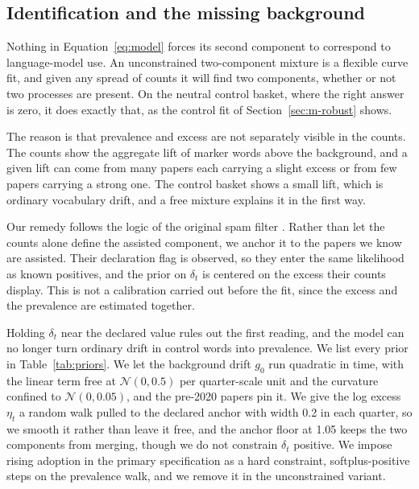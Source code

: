 \documentclass[twocolumn]{aastex631}
\begin{document}
\subsection{Identification and the missing background}\label{sec:m-ident}

Nothing in Equation~\ref{eq:model} forces its second component to correspond to language-model use. An unconstrained two-component mixture is a flexible curve fit, and given any spread of counts it will find two components, whether or not two processes are present. On the neutral control basket, where the right answer is zero, it does exactly that, as the control fit of Section~\ref{sec:m-robust} shows.

The reason is that prevalence and excess are not separately visible in the counts. The counts show the aggregate lift of marker words above the background, and a given lift can come from many papers each carrying a slight excess or from few papers carrying a strong one. The control basket shows a small lift, which is ordinary vocabulary drift, and a free mixture explains it in the first way.

Our remedy follows the logic of the original spam filter \citep{Sahami1998}. Rather than let the counts alone define the assisted component, we anchor it to the papers we know are assisted. Their declaration flag is observed, so they enter the same likelihood as known positives, and the prior on $\delta_t$ is centered on the excess their counts display. This is not a calibration carried out before the fit, since the excess and the prevalence are estimated together.

Holding $\delta_t$ near the declared value rules out the first reading, and the model can no longer turn ordinary drift in control words into prevalence. We list every prior in Table~\ref{tab:priors}. We let the background drift $g_0$ run quadratic in time, with the linear term free at $\mathcal{N}(0,0.5)$ per quarter-scale unit and the curvature confined to $\mathcal{N}(0,0.05)$, and the pre-2020 papers pin it. We give the log excess $\eta_t$ a random walk pulled to the declared anchor with width 0.2 in each quarter, so we smooth it rather than leave it free, and the anchor floor at 1.05 keeps the two components from merging, though we do not constrain $\delta_t$ positive. We impose rising adoption in the primary specification as a hard constraint, softplus-positive steps on the prevalence walk, and we remove it in the unconstrained variant.
\end{document}
